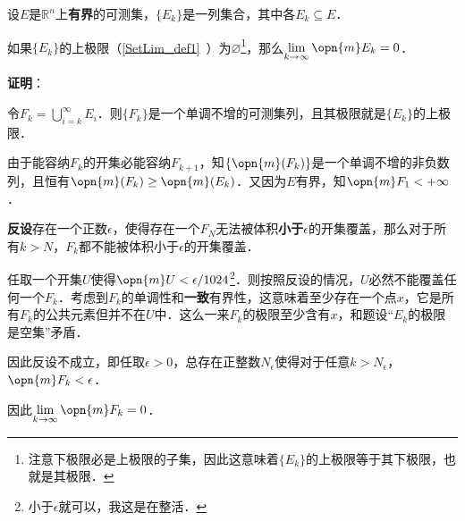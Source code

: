 



\begin{lemma}{}\label{EgrfTh_lem1}
设$E$是$\mathbb{R}^n$上\textbf{有界}的可测集，$\{E_k\}$是一列集合，其中各$E_k\subseteq E$．

如果$\{E_k\}$的上极限（\autoref{SetLim_def1}~）为$\varnothing$\footnote{注意下极限必是上极限的子集，因此这意味着$\{E_k\}$的上极限等于其下极限，也就是其极限．}，那么$\lim\limits_{k\to\infty}\opn{m}E_k=0$．
\end{lemma}

\textbf{证明}：

令$F_k=\bigcup_{i=k}^\infty E_i$．则$\{F_k\}$是一个单调不增的可测集列，且其极限就是$\{E_k\}$的上极限．

由于能容纳$F_k$的开集必能容纳$F_{k+1}$，知$\{\opn{m}(F_k)\}$是一个单调不增的非负数列，且恒有$\opn{m}(F_k)\geq\opn{m}(E_k)$．又因为$E$有界，知$\opn{m}F_1<+\infty$．

\textbf{反设}存在一个正数$\epsilon$，使得存在一个$F_N$无法被体积\textbf{小于}$\epsilon$的开集覆盖，那么对于所有$k>N$，$F_k$都不能被体积小于$\epsilon$的开集覆盖．

任取一个开集$U$使得$\opn{m}U<\epsilon/1024$\footnote{小于$\epsilon$就可以，我这是在整活．}．则按照反设的情况，$U$必然不能覆盖任何一个$F_k$．考虑到$F_k$的单调性和\textbf{一致}有界性，这意味着至少存在一个点$x$，它是所有$F_k$的公共元素但并不在$U$中．这么一来$F_k$的极限至少含有$x$，和题设“$E_k$的极限是空集”矛盾．

因此反设不成立，即任取$\epsilon>0$，总存在正整数$N_\epsilon$使得对于任意$k>N_\epsilon$，$\opn{m}F_k<\epsilon$．

因此$\lim\limits_{k\to\infty}\opn{m}F_k=0$．

